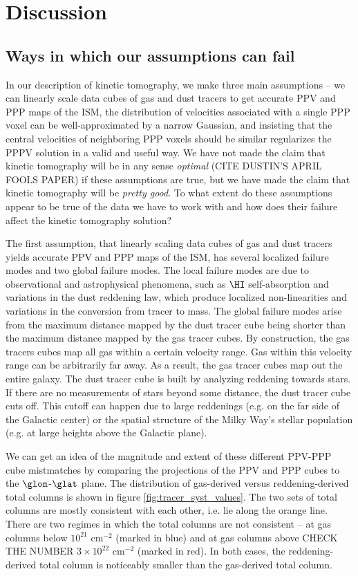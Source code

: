 \section{Discussion}
\label{sec:discussion}

\subsection{Ways in which our assumptions can fail}
\label{sec:discussion-systematics}
In our description of kinetic tomography, we make three main assumptions -- we can linearly scale data cubes of gas and dust tracers to get accurate PPV and PPP maps of the ISM, the distribution of velocities associated with a single PPP voxel can be well-approximated by a narrow Gaussian, and insisting that the central velocities of neighboring PPP voxels should be similar regularizes the PPPV solution in a valid and useful way.
We have not made the claim that kinetic tomography will be in any sense \emph{optimal} (CITE DUSTIN'S APRIL FOOLS PAPER) if these assumptions are true, but we have made the claim that kinetic tomography will be \emph{pretty good}. 
To what extent do these assumptions appear to be true of the data we have to work with and how does their failure affect the kinetic tomography solution?

The first assumption, that linearly scaling data cubes of gas and dust tracers yields accurate PPV and PPP maps of the ISM, has several localized failure modes and two global failure modes. 
The local failure modes are due to observational and astrophysical phenomena, such as $\HI$ self-absorption and variations in the dust reddening law, which produce localized non-linearities and variations in the conversion from tracer to mass. 
The global failure modes arise from the maximum distance mapped by the dust tracer cube being shorter than the maximum distance mapped by the gas tracer cubes. 
By construction, the gas tracers cubes map all gas within a certain velocity range. 
Gas within this velocity range can be arbitrarily far away. 
As a result, the gas tracer cubes map out the entire galaxy.
The dust tracer cube is built by analyzing reddening towards stars. If there are no measurements of stars beyond some distance, the dust tracer cube cuts off.
This cutoff can happen due to large reddenings (e.g. on the far side of the Galactic center) or the spatial structure of the Milky Way's stellar population (e.g. at large heights above the Galactic plane).

We can get an idea of the magnitude and extent of these different PPV-PPP cube mistmatches by comparing the projections of the PPV and PPP cubes to the $\glon$-$\glat$ plane. 
The distribution of gas-derived versus reddening-derived total columns is shown in figure \ref{fig:tracer_syst_values}. 
The two sets of total columns are mostly consistent with each other, i.e. lie along the orange line. 
There are two regimes in which the total columns are not consistent -- at gas columns below $10^{21}$ cm$^{-2}$ (marked in  blue) and at gas columns above CHECK THE NUMBER $3 \times 10^{22}$ cm$^{-2}$ (marked in red). 
In both cases, the reddening-derived total column is noticeably smaller than the gas-derived total column.

